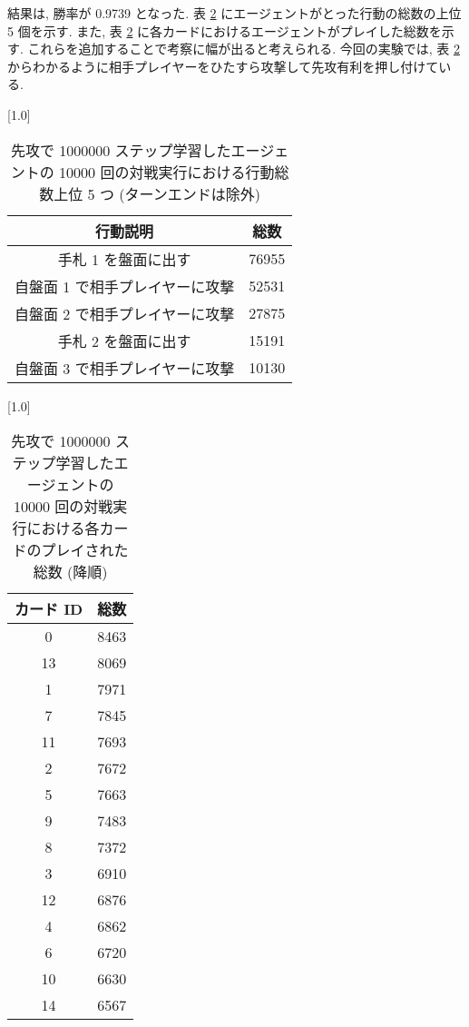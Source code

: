 \documentclass{jarticle}     %
\begin{document}
結果は, 勝率が 0.9739 となった.
表 \ref{table:DQNCardCount} にエージェントがとった行動の総数の上位 5 個を示す. また, 表 \ref{table:DQNCardCount} に各カードにおけるエージェントがプレイした総数を示す. これらを追加することで考察に幅が出ると考えられる. 今回の実験では, 表 \ref{table:DQNCardCount} からわかるように相手プレイヤーをひたすら攻撃して先攻有利を押し付けている.

\begin{table}[ht]
  \centering
  \caption{先攻で 1000000 ステップ学習したエージェントの 10000 回の対戦実行における行動総数上位 5 つ (ターンエンドは除外)}
  \vspace{-0.3cm}
  \label{table:DQNFirstaction}
  \scalebox{1.0}[1.0]{
    \begin{tabular}{|c|c|}
      \hline
      行動説明 & 総数 \\ \hline
      手札 1 を盤面に出す & 76955 \\ \hline
      自盤面 1 で相手プレイヤーに攻撃 & 52531 \\ \hline
      自盤面 2 で相手プレイヤーに攻撃 & 27875 \\ \hline
      手札 2 を盤面に出す & 15191 \\ \hline
      自盤面 3 で相手プレイヤーに攻撃 & 10130 \\ \hline
      \end{tabular}
  }
  \end{table}

  \begin{table}[ht]
    \centering
    \caption{先攻で 1000000 ステップ学習したエージェントの 10000 回の対戦実行における各カードのプレイされた総数 (降順)}
    \vspace{-0.3cm}
    \label{table:DQNCardCount}
    \scalebox{1.0}[1.0]{
      \begin{tabular}{|c|c|}
        \hline
        カード ID  & 総数 \\ \hline
        0 & 8463 \\ \hline
        13 & 8069 \\ \hline
        1 & 7971 \\ \hline
        7 & 7845 \\ \hline
        11 & 7693 \\ \hline
        2 & 7672 \\ \hline
        5 & 7663 \\ \hline
        9 & 7483 \\ \hline
        8 & 7372 \\ \hline
        3 & 6910 \\ \hline
        12 & 6876 \\ \hline
        4 & 6862 \\ \hline
        6 & 6720 \\ \hline
        10 & 6630 \\ \hline
        14 &  6567 \\ \hline
        \end{tabular}
    }
    \end{table}
\end{document}
